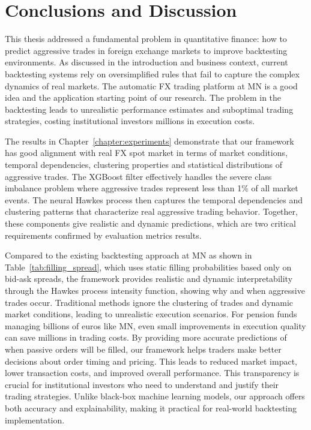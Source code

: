 \chapter{Conclusions and Discussion}\label{chapter:cd}
This thesis addressed a fundamental problem in quantitative finance: how to predict aggressive trades in foreign exchange markets to improve backtesting environments. As discussed in the introduction and business context, current backtesting systems rely on oversimplified rules that fail to capture the complex dynamics of real markets. The automatic FX trading platform at MN is a good idea and the application starting point of our research. The problem in the backtesting leads to unrealistic performance estimates and suboptimal trading strategies, costing institutional investors millions in execution costs.

The results in Chapter~\ref{chapter:experiments} demonstrate that our framework has good alignment with real FX spot market in terms of market conditions, temporal dependencies, clustering properties and statistical distributions of aggressive trades. The XGBoost filter effectively handles the severe class imbalance problem where aggressive trades represent less than 1\% of all market events. The neural Hawkes process then captures the temporal dependencies and clustering patterns that characterize real aggressive trading behavior. Together, these components give realistic and dynamic predictions, which are two critical requirements confirmed by evaluation metrics results.

Compared to the existing backtesting approach at MN as shown in Table~\ref{tab:filling_spread}, which uses static filling probabilities based only on bid-ask spreads, the framework provides realistic and dynamic interpretability through the Hawkes process intensity function, showing why and when aggressive trades occur. Traditional methods ignore the clustering of trades and dynamic market conditions, leading to unrealistic execution scenarios. For pension funds managing billions of euros like MN, even small improvements in execution quality can save millions in trading costs. By providing more accurate predictions of when passive orders will be filled, our framework helps traders make better decisions about order timing and pricing. This leads to reduced market impact, lower transaction costs, and improved overall performance.  This transparency is crucial for institutional investors who need to understand and justify their trading strategies. Unlike black-box machine learning models, our approach offers both accuracy and explainability, making it practical for real-world backtesting implementation.


